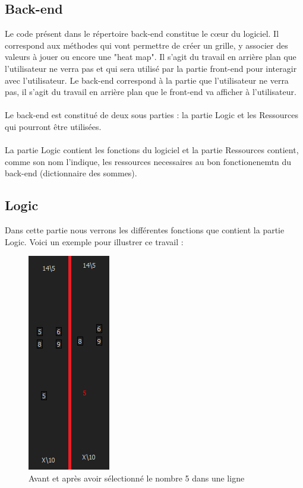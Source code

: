 \documentclass[12pt]{article}
\begin{document}
\subsection{Back-end}
Le code présent dans le répertoire back-end constitue le cœur du logiciel. Il correspond aux méthodes qui vont permettre de créer un grille, y associer des valeurs à jouer ou  encore une "heat map". Il s'agit du travail en arrière plan que l'utilisateur ne verra pas et qui sera utilisé par la partie front-end pour interagir avec l'utilisateur.
Le back-end correspond à la partie que l'utilisateur ne verra pas, il s'agit du travail en arrière plan que le front-end va afficher à l'utilisateur. \\ \\ 
Le back-end est constitué de deux sous parties : la partie Logic et les Ressources qui pourront être utilisées. \\ \\
La partie Logic contient les fonctions du logiciel et la partie Ressources contient, comme son nom l'indique, les ressources necessaires au bon fonctionenemtn du back-end (dictionnaire des sommes).
\subsection{Logic}
Dans cette partie nous verrons les différentes fonctions que contient la partie Logic. 
\newpage
Voici un exemple pour illustrer ce travail : 
\begin{figure}[ht]
  \begin{center}
    \includegraphics[scale=0.5]{./ressources/retrait.png} 
  \end{center}
  \caption{Avant et après avoir sélectionné le nombre 5 dans une ligne}
\end{figure} 
\end{document}
